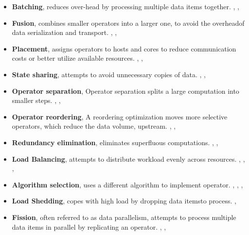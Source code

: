 \begin{itemize}
    \item \textbf{Batching}, reduces over-head by processing multiple data items together. \cite{Carney}, \cite{Gordon}, \cite{Welsh}
    
    \item \textbf{Fusion}, combines smaller operators  into  a  larger  one,  to  avoid  the  overheadof data serialization and transport. \cite{Gordon}, \cite{Tatbul}, \cite{Khandekar}
    
    \item \textbf{Placement}, assigns operators  to  hosts  and  cores  to  reduce  communication  costs  or  better  utilize  available  resources. \cite{Gordon}, \cite{Pietzuch}, \cite{Wolf}
    
    \item \textbf{State sharing}, attempts to  avoid  unnecessary  copies  of  data. \cite{Brito}, \cite{Arasu}, \cite{Sermulins}
    
    \item \textbf{Operator separation}, Operator separation  splits  a  large  computation  into  smaller steps. \cite{dbms}, \cite{Yu}, \cite{Ottoni}
    
    \item \textbf{Operator reordering}, A  reordering optimization moves more selective operators, which reduce the data volume,  upstream. \cite{dbms}, \cite{Graefe}, \cite{Avnur}
    
    \item \textbf{Redundancy elimination}, eliminates superfluous computations. \cite{Forgy}, \cite{Chen}, \cite{Pietzuch}
    
    \item \textbf{Load Balancing}, attempts  to  distribute  workload  evenly  across resources. \cite{Gordon}, \cite{Arpaci}, \cite{Caneill}, \cite{Amini}
    
    \item \textbf{Algorithm selection}, uses  a  different  algorithm  to  implement operator. \cite{dbms}, \cite{Welsh}, \cite{Wolf}, \cite{Abadi}
    
    \item \textbf{Load Shedding}, copes  with  high  load  by  dropping  data  itemsto   process. \cite{Tatbul}, \cite{Gedik}
    
    \item \textbf{Fission}, often referred to   as   data   parallelism,   attempts   to   process multiple data items in parallel by replicating an operator. \cite{Gordon}, \cite{Schneider}, \cite{Brito}
\end{itemize} 

